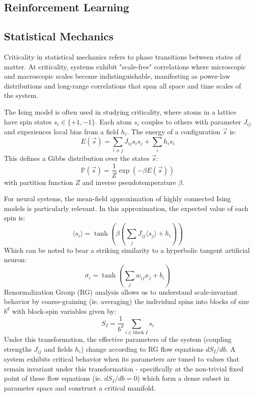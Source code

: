 \subsection{Reinforcement Learning}

\subsection{Statistical Mechanics}

Criticality in statistical mechanics refers to phase transitions between states of matter. At criticality, systems exhibit "scale-free" correlations where microscopic and macroscopic scales become indistinguishable, manifesting as power-law distributions and long-range correlations that span all space and time scales of the system.

The Ising model is often used in studying criticality, where atoms in a lattice have spin states $s_i \in \{+1, -1\}$. Each atom $s_i$ couples to others with parameter $J_{ij}$ and experiences local bias from a field $h_i$. The energy of a configuration $\vec{s}$ is:
\begin{equation}E(\vec{s}) = \sum_{i\neq j} J_{ij} s_is_j + \sum_i h_is_i\end{equation}
This defines a Gibbs distribution over the states $\vec{s}$:
\begin{equation}\mathbb{P}(\vec{s})=\dfrac{1}{Z}\exp(-\beta E(\vec{s}))\end{equation}
with partition function $Z$ and inverse pseudotemperature $\beta$.

For neural systems, the mean-field approximation of highly connected Ising models is particularly relevant. In this approximation, the expected value of each spin is:
\begin{equation}
\langle s_i \rangle = \tanh(\beta(\sum_j J_{ij}\langle s_j \rangle + h_i))
\end{equation}
Which can be noted to bear a striking similarity to a hyperbolic tangent artificial neuron:
\begin{equation}
\sigma_i = \tanh(\sum_j w_{ij}x_j + b_i)
\end{equation}
Renormalization Group (RG) analysis allows us to understand scale-invariant behavior by coarse-graining (ie. averaging) the individual spins into blocks of size $b^d$ with block-spin variables given by:
\begin{equation}
S_I = \frac{1}{b^d}\sum_{i \in \text{block } I} s_i
\end{equation} Under this transformation, the effective parameters of the system (coupling strengths $J_{ij}$ and fields $h_i$) change according to RG flow equations $dS_I/db$. A system exhibits critical behavior when its parameters are tuned to values that remain invariant under this transformation  - specifically at the non-trivial fixed point of these flow equations (ie. $dS_I/db=0$) which form a dense subset in parameter space and construct a critical manifold.

